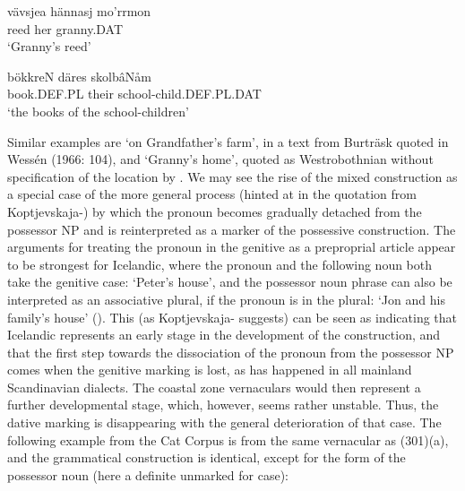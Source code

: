 
\item 


 \ea\label{}
\gll vävsjea  hännasj  mo’rrmon\\


reed  her  granny.DAT\\

\glt ‘Granny’s reed’

\z

\item 


 \ea\label{}
\gll bökkreN  däres  skolbâNåm\\


book.DEF.PL  their  school-child.DEF.PL.DAT\\

\glt ‘the books of the school-children’

\z

Similar examples are  ‘on Grandfather’s farm’, in a text from Burträsk quoted in Wessén (1966: 104), and  ‘Granny’s home’, quoted as Westrobothnian without specification of the location by \citet[131]{Larsson1929}. We may see the rise of the mixed construction as a special case of the more general process (hinted at in the quotation from Koptjevskaja-\citet{Tamm2003}) by which the pronoun becomes gradually detached from the possessor NP and is reinterpreted as a marker of the possessive construction. The arguments for treating the pronoun in the genitive as a preproprial article appear to be strongest for Icelandic, where the pronoun and the following noun both take the genitive case: ‘Peter’s house’, and the possessor noun phrase can also be interpreted as an associative plural, if the pronoun is in the plural:  ‘Jon and his family’s house’ (\citet[69]{Delsing2003b}). This (as Koptjevskaja-\citet[632]{Tamm2003} suggests) can be seen as indicating that Icelandic represents an early stage in the development of the construction, and that the first step towards the dissociation of the pronoun from the possessor NP comes when the genitive marking is lost, as has happened in all mainland Scandinavian dialects. The coastal zone vernaculars would then represent a further developmental stage, which, however, seems rather unstable. Thus, the dative marking is disappearing with the general deterioration of that case. The following example from the Cat Corpus is from the same vernacular as (301)(a), and the grammatical construction is identical, except for the form of the possessor noun (here a definite unmarked for case): 

